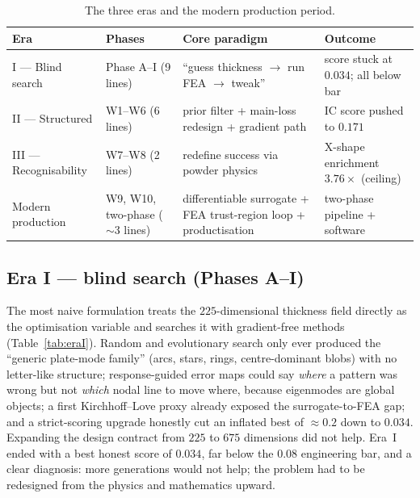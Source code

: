 \documentclass[11pt,a4paper]{article}
\begin{document}
\begin{table}[h]
\centering
\caption{The three eras and the modern production period.}
\label{tab:eras}
\small
\begin{tabular}{@{}p{2.9cm}p{3.0cm}p{5.2cm}p{3.4cm}@{}}
\toprule
Era & Phases & Core paradigm & Outcome \\
\midrule
I --- Blind search & Phase A--I (9 lines) & ``guess thickness $\to$ run FEA $\to$ tweak'' & score stuck at $0.034$; all below bar \\
II --- Structured & W1--W6 (6 lines) & prior filter + main-loss redesign + gradient path & IC score pushed to $0.171$ \\
III --- Recognisability & W7--W8 (2 lines) & redefine success via powder physics & X-shape enrichment $3.76\times$ (ceiling) \\
Modern production & W9, W10, two-phase ($\sim$3 lines) & differentiable surrogate + FEA trust-region loop + productisation & two-phase pipeline + software \\
\bottomrule
\end{tabular}
\end{table}

\subsection{Era I --- blind search (Phases A--I)}\label{sec:eraI}
The most naive formulation treats the $225$-dimensional thickness field directly
as the optimisation variable and searches it with gradient-free methods
(Table~\ref{tab:eraI}). Random and evolutionary search only ever produced the
``generic plate-mode family'' (arcs, stars, rings, centre-dominant blobs) with no
letter-like structure; response-guided error maps could say \emph{where} a pattern
was wrong but not \emph{which} nodal line to move where, because eigenmodes are
global objects; a first Kirchhoff--Love proxy already exposed the
surrogate-to-FEA gap; and a strict-scoring upgrade honestly cut an inflated best
of $\approx0.2$ down to $0.034$. Expanding the design contract from $225$ to
$675$ dimensions did not help. Era~I ended with a best honest score of $0.034$,
far below the $0.08$ engineering bar, and a clear diagnosis: more generations
would not help; the problem had to be redesigned from the physics and mathematics
upward.
\end{document}
